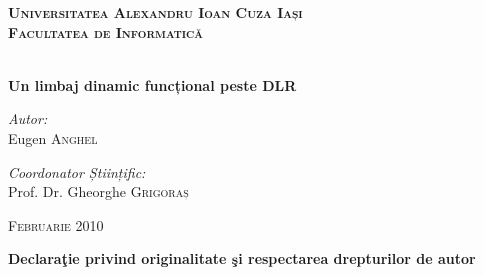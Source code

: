 \documentclass[12pt,a4paper]{memoir}
\begin{document}
\thispagestyle{empty}
\vspace*{-4cm}
\begin{centering}
\textbf{\textsc{\Large{Universitatea Alexandru Ioan Cuza Iași\\Facultatea de Informatică}}}

\vspace{7cm}

\textbf{\\[0.5cm]
\LARGE{Un limbaj dinamic funcțional peste DLR}}
\\[3cm]

\flushleft
\begin{minipage}{0.4\linewidth}
\centering
\large
\emph{Autor:}\\
Eugen \textsc{Anghel}
\end{minipage}
\hspace{0.5cm}
\flushright
\vspace{-1.5cm}
\begin{minipage}{0.5\linewidth}
\centering
\large
\emph{Coordonator Științific:} \\
Prof. Dr. Gheorghe \textsc{Grigoraș}
\end{minipage}
\vfill
\centering\large{\textsc{Februarie 2010}}\\
\end{centering}
\cleardoublepage
\thispagestyle{empty}
\begin{centering}
\LARGE{\textbf{Declaraţie privind originalitate şi respectarea drepturilor de autor}}
\end{centering}

\vspace{2cm}
\end{document}
